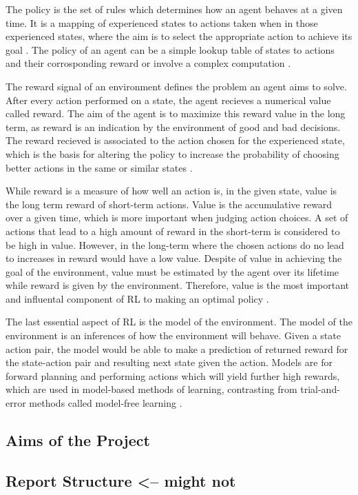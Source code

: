 The policy is the set of rules which determines how an agent behaves at a given time. It is a mapping of experienced states to actions taken when in those experienced states, where the aim is to select the appropriate action to achieve its goal \cite{GabrieleDe}. The policy of an agent can be a simple lookup table of states to actions and their corrosponding reward or involve a complex computation \cite{Sutton1}. 

The reward signal of an environment defines the problem an agent aims to solve. After every action performed on a state, the agent recieves a numerical value called reward. The aim of the agent is to maximize this reward value in the long term, as reward is an indication by the environment of good and bad decisions. The reward recieved is associated to the action chosen for the experienced state, which is the basis for altering the policy to increase the probability of choosing better actions in the same or similar states \cite{Sutton1}. 

While reward is a measure of how well an action is, in the given state, value is the long term reward of short-term actions. Value is the accumulative reward over a given time, which is more important when judging action choices. A set of actions that lead to a high amount of reward in the short-term is considered to be high in value. However, in the long-term where the chosen actions do no lead to increases in reward would have a low value. Despite of value in achieving the goal of the environment, value must be estimated by the agent over its lifetime while reward is given by the environment. Therefore, value is the most important and influental component of RL to making an optimal policy \cite{Sutton1}. 

The last essential aspect of RL is the model of the environment. The model of the environment is an inferences of how the environment will behave. Given a state action pair, the model would be able to make a prediction of returned reward for the state-action pair and resulting next state given the action. Models are for forward planning and performing actions which will yield further high rewards, which are used in model-based methods of learning, contrasting from trial-and-error methods called model-free learning \cite{Sutton1}.



\subsection{Aims of the Project}
\subsection{Report Structure <-- might not}
